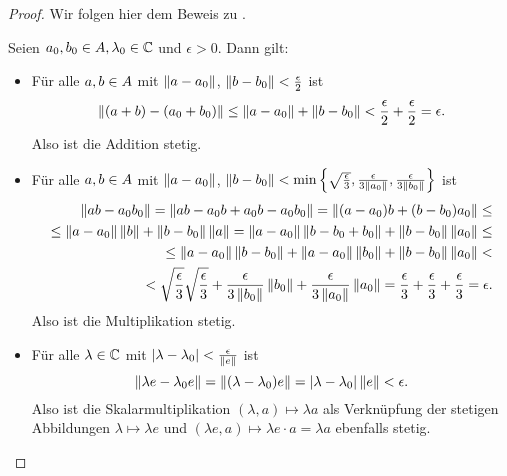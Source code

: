 \begin{proof}Wir folgen hier dem Beweis zu \cite[Lemma 2.1.14]{Baer2003}.

Seien $a_0, b_0 \in A, \lambda_0 \in \mathbb{C}$ und $\epsilon > 0$. Dann gilt:
\begin{itemize}
\item Für alle $a,b \in A$ mit $\left\lVert a-a_0\right\rVert$, $\left\lVert b-b_0\right\rVert < \frac{\epsilon}{2}$ ist
		\[\left\lVert(a+b) - (a_0+b_0)\right\rVert \leq \left\lVert a-a_0\right\rVert + \left\lVert b-b_0\right\rVert < \frac{\epsilon}{2} + \frac{\epsilon}{2} = \epsilon.\]
		Also ist die Addition stetig.
		
\item Für alle $a,b \in A$ mit $\left\lVert a-a_0\right\rVert$, $\left\lVert b-b_0\right\rVert < \min\left\lbrace\sqrt{\frac{\epsilon}{3}}, \frac{\epsilon}{3\left\lVert a_0\right\rVert}, \frac{\epsilon}{3\left\lVert b_0\right\rVert}\right\rbrace$ ist
		\begin{align*}
		\left\lVert ab - a_0b_0\right\rVert = \left\lVert ab -a_0b +a_0b -a_0b_0\right\rVert = \left\lVert(a-a_0)b + (b-b_0)a_0\right\rVert \leq \\
		\leq \left\lVert a-a_0\right\rVert\left\lVert b\right\rVert + \left\lVert b-b_0\right\rVert\left\lVert a\right\rVert = \left\lVert a-a_0\right\rVert\left\lVert b-b_0+b_0\right\rVert + \left\lVert b-b_0\right\rVert\left\lVert a_0\right\rVert \leq \\
		\leq \left\lVert a-a_0\right\rVert\left\lVert b-b_0\right\rVert + \left\lVert a-a_0\right\rVert\left\lVert b_0\right\rVert + \left\lVert b-b_0\right\rVert\left\lVert a_0\right\rVert < \\
		< \sqrt{\frac{\epsilon}{3}} \sqrt{\frac{\epsilon}{3}} + \frac{\epsilon}{3\left\lVert b_0\right\rVert}\left\lVert b_0\right\rVert + \frac{\epsilon}{3\left\lVert a_0\right\rVert}\left\lVert a_0\right\rVert = \frac{\epsilon}{3} + \frac{\epsilon}{3} + \frac{\epsilon}{3} = \epsilon.		
		\end{align*}
		Also ist die Multiplikation stetig.
		
\item Für alle $\lambda \in \mathbb{C}$ mit $|\lambda - \lambda_0| < \frac{\epsilon}{\left\lVert e\right\rVert}$ ist
		\[\left\lVert\lambda e - \lambda_0 e\right\rVert = \left\lVert(\lambda-\lambda_0)e\right\rVert = |\lambda - \lambda_0| \left\lVert e\right\rVert < \epsilon.\]
		Also ist die Skalarmultiplikation $(\lambda,a) \mapsto \lambda a$ als Verknüpfung der stetigen Abbildungen $\lambda \mapsto \lambda e$ und $(\lambda e, a) \mapsto \lambda e \cdot a = \lambda a$ ebenfalls stetig.
		

\end{itemize}
\end{proof}
